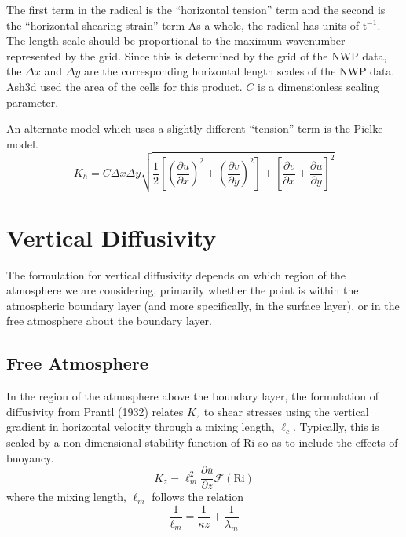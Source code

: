 The first term in the radical is the ``horizontal tension'' term and the second is
the ``horizontal shearing strain'' term %
As a whole, the radical has units of $\mathrm{t}^{-1}$.
The length scale should be proportional to the maximum wavenumber represented by the grid.
Since this is determined by the grid of the NWP data, the $\Delta x$ and $\Delta y$ are the 
corresponding horizontal length scales of the NWP data. Ash3d used the area of the cells
for this product. $C$ is a dimensionless scaling parameter.

An alternate model which uses a slightly different ``tension'' term is the Pielke model.
\begin{equation}
K_h = C \Delta x \Delta y \sqrt{
\frac{1}{2}\left[ \left(\frac{\partial u}{\partial x}\right)^2 + \left(\frac{\partial v}{\partial y}\right)^2 \right]
+ \left[ \frac{\partial v}{\partial x} +\frac{\partial u}{\partial y} \right]^2}
\end{equation}


\section{Vertical Diffusivity}\label{ChapAppendVarDiff_Sec_Kv}
The formulation for vertical diffusivity depends on which region of the atmosphere
we are considering, primarily whether the point is within the atmospheric boundary
layer (and more specifically, in the surface layer), or in the free atmosphere
about the boundary layer.

\subsection{Free Atmosphere}
In the region of the atmosphere above the boundary layer, the formulation of diffusivity
from Prantl (1932) relates $K_z$ to shear stresses using the vertical gradient in
horizontal velocity through a mixing length, $\ell_c$. %
Typically, this is scaled by a non-dimensional stability function of $\mathrm{Ri}$ so as to
include the effects of buoyancy.
\begin{equation}
K_z = \ell_m^2 \frac{\partial \overline{u}}{\partial z}  \mathcal{F}(\mathrm{Ri})
\end{equation}
where the mixing length, $\ell_m$ follows the relation
\begin{equation}
\frac{1}{\ell_m} = \frac{1}{\kappa z} + \frac{1}{\lambda_m}
\end{equation}

